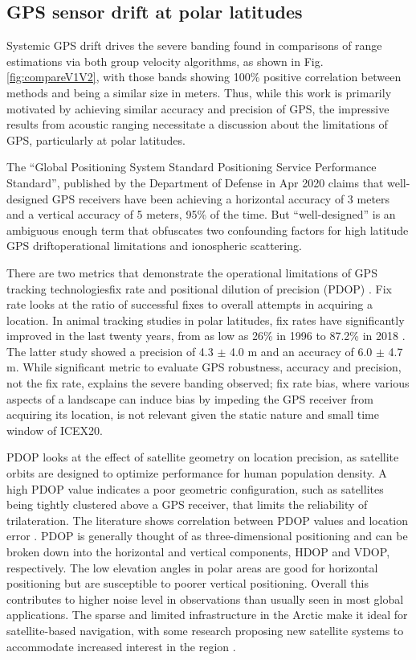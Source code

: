 \FloatBarrier
\subsection{GPS sensor drift at polar latitudes}

Systemic GPS drift drives the severe banding found in comparisons of range estimations via both group velocity algorithms, as shown in Fig. \ref{fig:compareV1V2}, with those bands showing 100\% positive correlation between methods and being a similar size in meters.
Thus, while this work is primarily motivated by achieving similar accuracy and precision of GPS, the impressive results from acoustic ranging necessitate a discussion about the limitations of GPS, particularly at polar latitudes.

The ``Global Positioning System Standard Positioning Service Performance Standard'', published by the Department of Defense in Apr 2020 claims that well-designed GPS receivers have been achieving a horizontal accuracy of 3 meters and a vertical accuracy of 5 meters, 95\% of the time.
But ``well-designed'' is an ambiguous enough term that obfuscates two confounding factors for high latitude GPS drift\textemdash operational limitations and ionospheric scattering.

There are two metrics that demonstrate the operational limitations of GPS tracking technologies\textemdash fix rate and positional dilution of precision (PDOP) \citep{swanlund_gps_2016}.
Fix rate looks at the ratio of successful fixes to overall attempts in acquiring a location.
In animal tracking studies in polar latitudes, fix rates have significantly improved in the last twenty years, from as low as 26\% in 1996 \citep{moen_effects_1996} to 87.2\% in 2018 \citep{jung_accuracy_2018}.
The latter study showed a precision of 4.3 $\pm$ 4.0 m and an accuracy of 6.0 $\pm$ 4.7 m.
While significant metric to evaluate GPS robustness, accuracy and precision, not the fix rate, explains the severe banding observed; fix rate bias, where various aspects of a landscape can induce bias by impeding the GPS receiver from acquiring its location, is not relevant given the static nature and small time window of ICEX20.

PDOP looks at the effect of satellite geometry on location precision, as satellite orbits are designed to optimize performance for human population density.
A high PDOP value indicates a poor geometric configuration, such as satellites being tightly clustered above a GPS receiver, that limits the reliability of trilateration.
The literature shows correlation between PDOP values and location error \citep{swanlund_gps_2016}.
PDOP is generally thought of as three-dimensional positioning and can be broken down into the horizontal and vertical components, HDOP and VDOP, respectively.
The low elevation angles in polar areas are good for horizontal positioning but are susceptible to poorer vertical positioning.
Overall this contributes to higher noise level in observations than usually seen in most global applications.
The sparse and limited infrastructure in the Arctic make it ideal for satellite-based navigation, with some research proposing new satellite systems to accommodate increased interest in the region \citep{reid_gnss_2016}.

